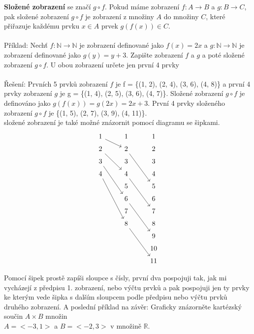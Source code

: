 \documentclass[12pt]{article}
\begin{document}
\textbf{Složené zobrazení} se značí $g \circ f$. Pokud máme zobrazení $f: A \rightarrow B$ a $g: B \rightarrow C$, pak složené zobrazení $g \circ f$ je zobrazení z množiny $A$ do množiny $C$, které přiřazuje každému prvku $x \in A$ prvek $g(f(x)) \in C$.\\
\\
Příklad: Nechť $f: \mathbb{N} \rightarrow \mathbb{N}$ je zobrazení definované jako $f(x) = 2x$ a $g: \mathbb{N} \rightarrow \mathbb{N}$ je zobrazení definované jako $g(y) = y + 3$. Zapište zobrazení $f$ a $g$ a poté složené zobrazení $g \circ f$. U obou zobrazení určete jen první 4 prvky
\\
\\
Řešení: Prvních 5 prvků zobrazení $f$ je f = \{(1, 2), (2, 4), (3, 6), (4, 8)\} a první 4 prvky zobrazení $g$ je g = \{(1, 4), (2, 5), (3, 6), (4, 7)\}. Složené zobrazení $g \circ f$ je definováno jako $g(f(x)) = g(2x) = 2x + 3$. První 4 prvky složeného zobrazení $g \circ f$ je \{(1, 5), (2, 7), (3, 9), (4, 11)\}.
\\ složené zobrazení je také možné znázornit pomocí diagramu se šipkami.
\[
\begin{tikzcd}[row sep = tiny]
    1 \arrow[rd] &  1  & 1\\
    2 \arrow[ddr] &  2 \arrow[dddr] & 2\\
    3 \arrow[dddr] &  3  & 3\\
    4 \arrow[ddddr] &  4 \arrow[dddr] & 4\\
                & 5 & 5 \\
                & 6 \arrow[dddr] & 6 \\
                & 7 & 7 \\
                & 8 \arrow[dddr] & 8 \\
                & & 9\\
                & & 10\\
                & & 11\\
\end{tikzcd}
\]
Pomocí šipek prostě zapíši sloupce s čísly, první dva pospojuji tak, jak mi vycházejí z předpisu 1. zobrazení, nebo výčtu prvků a pak pospojuji jen ty prvky ke kterým vede šipka s dalším sloupcem podle předpisu nebo výčtu prvků druhého zobrazení.
\newpage
A poslední příklad na závěr: Graficky znázorněte kartézský součin $A \times B$ množin \\$A = <-3, 1>$ a $B = <-2, 3>$ v množině $\mathbb{R}$. 
\end{document}
